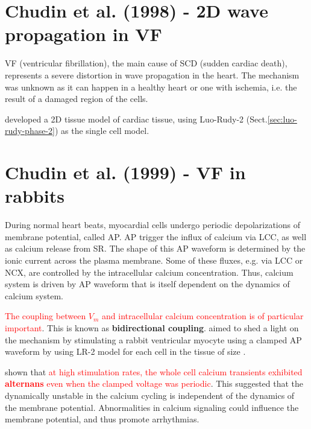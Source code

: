 \citep{beaumont1998}

\section{Chudin et al. (1998) - 2D wave propagation in VF}
\label{sec:chudin1998}

VF (ventricular fibrillation), the main cause of SCD (sudden cardiac death),
represents a severe distortion in wave propagation in the heart. The mechanism
was unknown as it can happen in a healthy heart or one with ischemia, i.e. 
the result of a damaged region of the cells.



\citep{chudin1998} developed a 2D tissue model of cardiac tissue, using
Luo-Rudy-2 (Sect.\ref{sec:luo-rudy-phase-2}) as the single cell model.

\section{Chudin et al. (1999) - VF in rabbits}
\label{sec:chudin-et-al}

During normal heart beats, myocardial cells undergo periodic
depolarizations of membrane potential, called AP. AP trigger the
influx of calcium via LCC, as well as calcium release from SR. The
shape of this AP waveform is determined by the ionic current across
the plasma membrane. Some of these fluxes, e.g. via LCC or NCX, are
controlled by the intracellular calcium concentration. Thus, calcium
system is driven by AP waveform that is itself dependent on the
dynamics of calcium system.

\textcolor{red}{The coupling between $V_m$ and intracellular calcium
  concentration is of particular important}.
This is known as
{\bf bidirectional coupling}. \citep{chudin1999icd} aimed to shed a light on
the mechanism by stimulating a rabbit ventricular myocyte using a clamped AP
waveform by using LR-2 model for each cell in the tissue of size . 

\citep{chudin1999icd} shown that 
\textcolor{red}{at high stimulation rates, the whole cell calcium
  transients exhibited {\bf alternans} even when the clamped voltage was
  periodic}. This suggested that the dynamically unstable in the calcium cycling is
independent of the dynamics of the membrane potential. Abnormalities in
calcium signaling could influence the membrane potential, and thus promote
arrhythmias.

